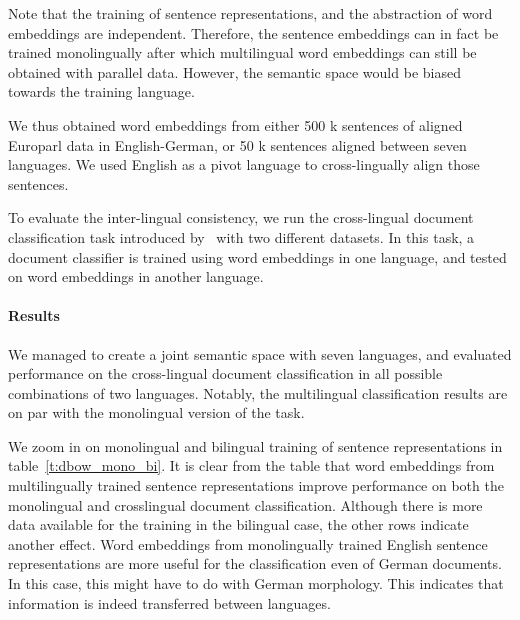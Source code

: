 \documentclass[a4paper,11pt]{article}
\begin{document}
Note that the training of sentence representations, and the abstraction of word embeddings are independent. Therefore, the sentence embeddings can in fact be trained monolingually after which multilingual word embeddings can still be obtained with parallel data. However, the semantic space would be biased towards the training language.


We thus obtained word embeddings from either 500 k sentences of aligned Europarl data in English-German, or 50 k sentences aligned between seven languages. We used English as a pivot language to cross-lingually align those sentences.


To evaluate the inter-lingual consistency, we run the cross-lingual document classification task introduced by~\cite{klementiev2012inducing} with two different datasets. In this task, a document classifier is trained using word embeddings in one language, and tested on word embeddings in another language. 


\paragraph{Results}

We managed to create a joint semantic space with seven languages, and evaluated performance on the cross-lingual document classification in all possible combinations of two languages. Notably, the multilingual classification results are on par with the monolingual version of the task. 

We zoom in on monolingual and bilingual training of sentence representations in table~\ref{t:dbow_mono_bi}. It is clear from the table that word embeddings from multilingually trained sentence representations improve performance on both the monolingual and crosslingual document classification. Although there is more data available for the training in the bilingual case, the other rows indicate another effect. 
Word embeddings from monolingually trained English sentence representations are more useful for the classification even of German documents. In this case, this might have to do with German morphology. This indicates that information is indeed transferred between languages.
\end{document}
